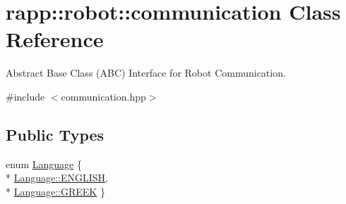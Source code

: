 \hypertarget{classrapp_1_1robot_1_1communication}{\section{rapp\-:\-:robot\-:\-:communication Class Reference}
\label{classrapp_1_1robot_1_1communication}
}


Abstract Base Class (A\-B\-C) Interface for Robot Communication.  




{\ttfamily \#include $<$communication.\-hpp$>$}

\subsection*{Public Types}
\begin{DoxyCompactItemize}
\item 
enum \hyperlink{classrapp_1_1robot_1_1communication_aa68950f71c5f18df6816725b50c3c62e}{Language} \{ \\*
\hyperlink{classrapp_1_1robot_1_1communication_aa68950f71c5f18df6816725b50c3c62ea11040bd29db4ec9964af9fd3f9a24f17}{Language\-::\-E\-N\-G\-L\-I\-S\-H}, 
\\*
\hyperlink{classrapp_1_1robot_1_1communication_aa68950f71c5f18df6816725b50c3c62ead4cacc28e56302bcec9d7af4bba8c9a7}{Language\-::\-G\-R\-E\-E\-K}
 \}
\end{DoxyCompactItemize}
